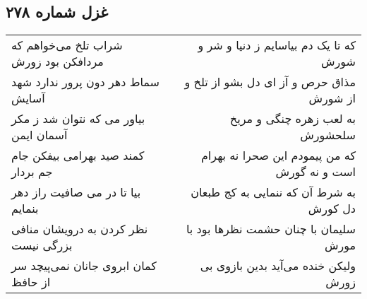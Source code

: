 \begin{center}
\section*{غزل شماره ۲۷۸}
\label{sec:sh278}
\begin{longtable}{l p{0.5cm} r}
شراب تلخ می‌خواهم که مردافکن بود زورش
&&
که تا یک دم بیاسایم ز دنیا و شر و شورش
\\
سماط دهر دون پرور ندارد شهد آسایش
&&
مذاق حرص و آز ای دل بشو از تلخ و از شورش
\\
بیاور می که نتوان شد ز مکر آسمان ایمن
&&
به لعب زهره چنگی و مریخ سلحشورش
\\
کمند صید بهرامی بیفکن جام جم بردار
&&
که من پیمودم این صحرا نه بهرام است و نه گورش
\\
بیا تا در می صافیت راز دهر بنمایم
&&
به شرط آن که ننمایی به کج طبعان دل کورش
\\
نظر کردن به درویشان منافی بزرگی نیست
&&
سلیمان با چنان حشمت نظرها بود با مورش
\\
کمان ابروی جانان نمی‌پیچد سر از حافظ
&&
ولیکن خنده می‌آید بدین بازوی بی زورش
\\
\end{longtable}
\end{center}
